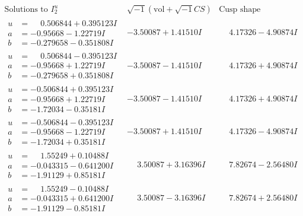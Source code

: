 \documentclass[1p]{elsarticle_modified}
\theoremstyle{definition}
\newcommand{\I}{\sqrt{-1}}
\begin{document}
$$\begin{array}{c|c|c}  
\text{Solutions to }I^u_{2}& \I (\text{vol} + \sqrt{-1}CS) & \text{Cusp shape}\\
 \hline 
\begin{aligned}
u &= \phantom{-}0.506844 + 0.395123 I \\
a &= -0.95668 - 1.22719 I \\
b &= -0.279658 - 0.351808 I\end{aligned}
 & -3.50087 + 1.41510 I & \phantom{-}4.17326 - 4.90874 I \\ \hline\begin{aligned}
u &= \phantom{-}0.506844 - 0.395123 I \\
a &= -0.95668 + 1.22719 I \\
b &= -0.279658 + 0.351808 I\end{aligned}
 & -3.50087 - 1.41510 I & \phantom{-}4.17326 + 4.90874 I \\ \hline\begin{aligned}
u &= -0.506844 + 0.395123 I \\
a &= -0.95668 + 1.22719 I \\
b &= -1.72034 - 0.35181 I\end{aligned}
 & -3.50087 - 1.41510 I & \phantom{-}4.17326 + 4.90874 I \\ \hline\begin{aligned}
u &= -0.506844 - 0.395123 I \\
a &= -0.95668 - 1.22719 I \\
b &= -1.72034 + 0.35181 I\end{aligned}
 & -3.50087 + 1.41510 I & \phantom{-}4.17326 - 4.90874 I \\ \hline\begin{aligned}
u &= \phantom{-}1.55249 + 0.10488 I \\
a &= -0.043315 - 0.641200 I \\
b &= -1.91129 + 0.85181 I\end{aligned}
 & \phantom{-}3.50087 + 3.16396 I & \phantom{-}7.82674 - 2.56480 I \\ \hline\begin{aligned}
u &= \phantom{-}1.55249 - 0.10488 I \\
a &= -0.043315 + 0.641200 I \\
b &= -1.91129 - 0.85181 I\end{aligned}
 & \phantom{-}3.50087 - 3.16396 I & \phantom{-}7.82674 + 2.56480 I \\ \hline\begin{aligned}

\end{aligned}
\end{array}$$
\end{document}
